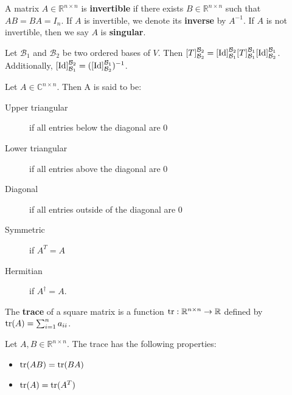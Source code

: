 \documentclass{bareminimum}
\begin{document}
	\begin{defn}
		A matrix $A \in \mathbb{R}^{n \times n}$ is \textbf{invertible}  if there exists $B \in \mathbb{R}^{n \times n}$ such that $AB = BA = I_n$. If $A$ is invertible, we denote its \textbf{inverse} by $A^{-1}$. If $A$ is not invertible, then we say $A$ is \textbf{singular}.
	\end{defn}
	
	\begin{prop}
		Let  $\mathcal{B}_1$ and $\mathcal{B}_2$ be two ordered bases of $V$. Then $[T]_{\mathcal{B}_2}^{\mathcal{B}_2} = [\operatorname{Id}]_{\mathcal{B}_1}^{\mathcal{B}_2} [T]_{\mathcal{B}_1}^{\mathcal{B}_1} [\operatorname{Id}]_{\mathcal{B}_2}^{\mathcal{B}_1}$. Additionally, $[\operatorname{Id}]_{\mathcal{B}_1}^{\mathcal{B}_2} = ([\operatorname{Id}]_{\mathcal{B}_2}^{\mathcal{B}_1})^{-1}$.
	\end{prop}
	
	\begin{defn}
		Let $A \in \mathbb{C}^{n \times n}$. Then A is said to be:
		\begin{description}
			\item[Upper triangular] if all entries below the diagonal are 0
			\item[Lower triangular] if all entries above the diagonal are 0
			\item[Diagonal] if all entries outside of the diagonal are 0
			\item[Symmetric] if $A^T = A$
			\item[Hermitian] if $A^\dagger = A$.
		\end{description}
	\end{defn}
	
	\begin{defn}[Trace]
		The \textbf{trace}  of a square matrix is a function $\operatorname{tr} : \mathbb{R}^{n \times n} \to \mathbb{R}$ defined by $\operatorname{tr}(A) = \sum_{i = 1}^n a_{i i}$. 
	\end{defn}
	
	\begin{prop}
		Let $A,B \in \mathbb{R}^{n \times n}$. The trace has the following properties:
		\begin{itemize}
			\item $\operatorname{tr}(AB) = \operatorname{tr}(BA)$
			\item $\operatorname{tr}(A) = \operatorname{tr}(A^T)$
		\end{itemize}
	\end{prop}
	
\end{document}
